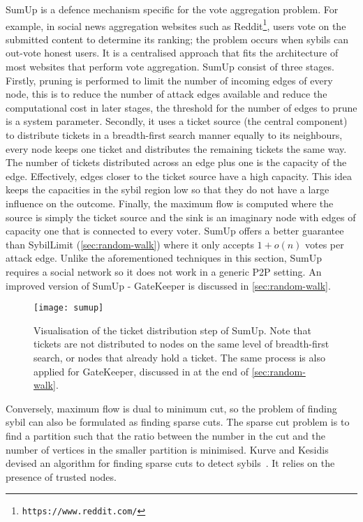 SumUp\cite{tran2009sybil} is a defence mechanism specific for the vote
aggregation problem. For example, in social news aggregation websites such as
Reddit\footnote{\texttt{https://www.reddit.com/}}, users vote on the submitted
content to determine its ranking; the problem occurs when sybils can out-vote
honest users. It is a centralised approach that fits the architecture of most
websites that perform vote aggregation. SumUp consist of three stages. Firstly,
pruning is performed to limit the number of incoming edges of every node, this
is to reduce the number of attack edges available and reduce the computational
cost in later stages, the threshold for the number of edges to prune is a system
parameter. Secondly, it uses a ticket source (the central component) to
distribute tickets in a breadth-first search manner equally to its neighbours,
every node keeps one ticket and distributes the remaining tickets the same way.
The number of tickets distributed across an edge plus one is the capacity of the
edge. Effectively, edges closer to the ticket source have a high capacity. This
idea keeps the capacities in the sybil region low so that they do not have a
large influence on the outcome. Finally, the maximum flow is computed where the
source is simply the ticket source and the sink is an imaginary node with edges
of capacity one that is connected to every voter. SumUp offers a better
guarantee than SybilLimit (\autoref{sec:random-walk}) where it only accepts $1 +
o(n)$ votes per attack edge. Unlike the aforementioned techniques in this
section, SumUp requires a social network so it does not work in a generic P2P
setting. An improved version of SumUp - GateKeeper is discussed in
\autoref{sec:random-walk}.

\begin{figure}
  \centering
  \texttt{[image: sumup]}
  \caption{Visualisation of the ticket distribution step of SumUp. Note that
    tickets are not distributed to nodes on the same level of breadth-first
    search, or nodes that already hold a ticket. The same process is also
    applied for GateKeeper, discussed in at the end of
    \autoref{sec:random-walk}.}
  \label{fig:sumup}
\end{figure}

Conversely, maximum flow is dual to minimum cut, so the problem of finding sybil
can also be formulated as finding sparse cuts. The sparse cut problem is to find
a partition such that the ratio between the number in the cut and the number of
vertices in the smaller partition is minimised. Kurve and Kesidis devised an
algorithm for finding sparse cuts to detect sybils~\cite{kurve2011sybil}. It
relies on the presence of trusted nodes.

